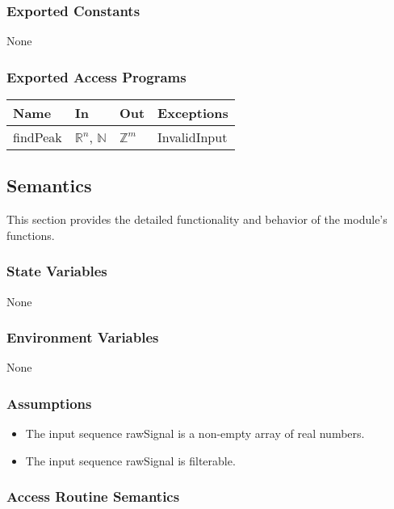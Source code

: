 \documentclass[12pt, titlepage]{article}
\begin{document}
\subsubsection{Exported Constants}

None

\subsubsection{Exported Access Programs}

\begin{center}
\begin{tabular}{p{2cm} p{4cm} p{4cm} p{2cm}}
\hline
\textbf{Name} & \textbf{In} & \textbf{Out} & \textbf{Exceptions} \\
\hline
findPeak & $\mathbb{R}^n$, $\mathbb{N}$ & $\mathbb{Z}^m$ & InvalidInput \\
\hline
\end{tabular}
\end{center}

\subsection{Semantics}

This section provides the detailed functionality and behavior of the module’s
functions.

\subsubsection{State Variables}

None

\subsubsection{Environment Variables}

None

\subsubsection{Assumptions}

\begin{itemize}
\item The input sequence rawSignal is a non-empty array of real numbers.
\item The input sequence rawSignal is filterable.
\end{itemize}

\subsubsection{Access Routine Semantics}
\end{document}
